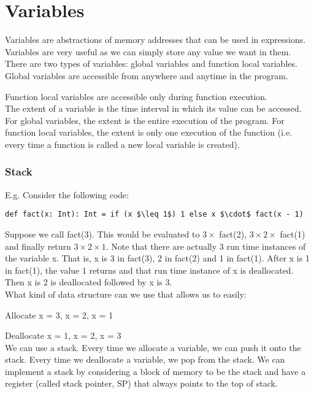 \documentclass[12pt, letterpaper]{article}
\begin{document}
\section{Variables}
Variables are abstractions of memory addresses that can be used in expressions. Variables are very useful as we can simply store any value we want in them. There are two types of variables: global variables and function local variables.\\

Global variables are accessible from anywhere and anytime in the program.

Function local variables are accessible only during function execution.\\

The extent of a variable is the time interval in which its value can be accessed. For global variables, the extent is the entire execution of the program. For function local variables, the extent is only one execution of the function (i.e. every time a function is called a new local variable is created).

\subsubsection{Stack}
E.g. Consider the following code:
\begin{lstlisting}[mathescape]
def fact(x: Int): Int = if (x $\leq 1$) 1 else x $\cdot$ fact(x - 1)
\end{lstlisting}


Suppose we call fact(3). This would be evaluated to \(3 \times\) fact(2), \(3 \times 2 \times\) fact(1) and finally return \(3 \times 2 \times 1\). Note that there are actually 3 run time instances of the variable x. That is, x is 3 in fact(3), 2 in fact(2) and 1 in fact(1). After x is 1 in fact(1), the value 1 returns and that run time instance of x is deallocated. Then x is 2 is deallocated followed by x is 3.\\

What kind of data structure can we use that allows us to easily:

Allocate x = 3, x = 2, x = 1

Deallocate x = 1, x = 2, x = 3\\

We can use a stack. Every time we allocate a variable, we can push it onto the stack. Every time we deallocate a variable, we pop from the stack. We can implement a stack by considering a block of memory to be the stack and have a register (called stack pointer, SP) that always points to the top of stack.\\
\end{document}
